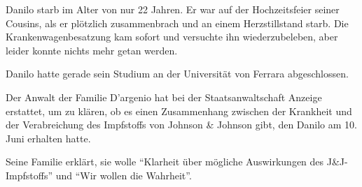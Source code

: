 

Danilo starb im Alter von nur 22 Jahren. Er war auf der Hochzeitsfeier seiner Cousins, als er plötzlich zusammenbrach und an einem Herzstillstand starb. Die Krankenwagenbesatzung kam sofort und versuchte ihn wiederzubeleben, aber leider konnte nichts mehr getan werden.

Danilo hatte gerade sein Studium an der Universität von Ferrara abgeschlossen.

Der Anwalt der Familie D'argenio hat bei der Staatsanwaltschaft Anzeige erstattet, um zu klären, ob es einen Zusammenhang zwischen der Krankheit und der Verabreichung des Impfstoffs von Johnson \& Johnson gibt, den Danilo am 10. Juni erhalten hatte.

Seine Familie erklärt, sie wolle “Klarheit über mögliche Auswirkungen des J\&J-Impfstoffs” und “Wir wollen die Wahrheit”.
